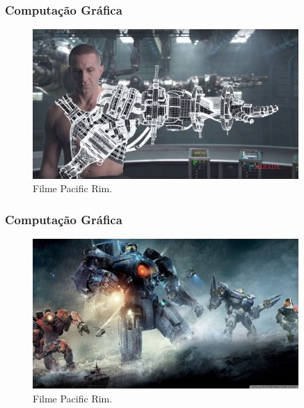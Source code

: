 \documentclass{beamer}
\begin{document}


\begin{frame}
\frametitle{Computação Gráfica}
	
	\begin{figure}[!h]
		\begin{center}
			\includegraphics[width=0.9\textwidth]{Figures/pr2}
			\caption{Filme Pacific Rim.}
		\end{center}
		
	\end{figure}
	

\end{frame}




\begin{frame}
\frametitle{Computação Gráfica}
	
	\begin{figure}[!h]
		\begin{center}
			\includegraphics[width=0.9\textwidth]{Figures/pr3}
			\caption{Filme Pacific Rim.}
		\end{center}
		
	\end{figure}
	

\end{frame}
\end{document}
